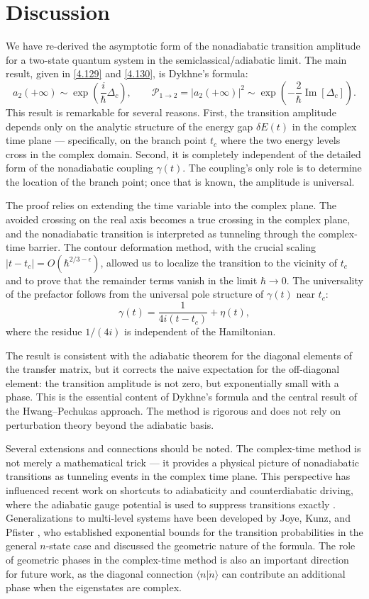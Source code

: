 \documentclass[12pt,a4paper]{article}
\begin{document}
	\section{Discussion} 
	
	We have re-derived the asymptotic form of the nonadiabatic transition amplitude for a two-state quantum system in the semiclassical/adiabatic limit. The main result, given in \eqref{4.129} and \eqref{4.130}, is Dykhne's formula:
	\[
	a_2(+\infty) \sim \exp\left( \frac{i}{\hbar} \Delta_c \right), \qquad 
	\mathcal{P}_{1 \to 2} = |a_2(+\infty)|^2 \sim \exp\left( -\frac{2}{\hbar} \operatorname{Im}[\Delta_c] \right).
	\]
	This result is remarkable for several reasons. First, the transition amplitude depends only on the analytic structure of the energy gap $\delta E(t)$ in the complex time plane — specifically, on the branch point $t_c$ where the two energy levels cross in the complex domain. Second, it is completely independent of the detailed form of the nonadiabatic coupling $\gamma(t)$. The coupling's only role is to determine the location of the branch point; once that is known, the amplitude is universal.
	
	The proof relies on extending the time variable into the complex plane. The avoided crossing on the real axis becomes a true crossing in the complex plane, and the nonadiabatic transition is interpreted as tunneling through the complex-time barrier. The contour deformation method, with the crucial scaling $|t - t_c| = O(\hbar^{2/3 - \epsilon})$, allowed us to localize the transition to the vicinity of $t_c$ and to prove that the remainder terms vanish in the limit $\hbar \to 0$. The universality of the prefactor follows from the universal pole structure of $\gamma(t)$ near $t_c$:
	\[
	\gamma(t) = \frac{1}{4i(t - t_c)} + \eta(t),
	\]
	where the residue $1/(4i)$ is independent of the Hamiltonian.
	
	The result is consistent with the adiabatic theorem for the diagonal elements of the transfer matrix, but it corrects the naive expectation for the off-diagonal element: the transition amplitude is not zero, but exponentially small with a phase. This is the essential content of Dykhne's formula and the central result of the Hwang–Pechukas approach. The method is rigorous and does not rely on perturbation theory beyond the adiabatic basis.
	
	Several extensions and connections should be noted. The complex-time method is not merely a mathematical trick — it provides a physical picture of nonadiabatic transitions as tunneling events in the complex time plane. This perspective has influenced recent work on shortcuts to adiabaticity and counterdiabatic driving, where the adiabatic gauge potential is used to suppress transitions exactly \cite{Cardoso2023}. Generalizations to multi-level systems have been developed by Joye, Kunz, and Pfister \cite{JoyeKunzPfister1991}, who established exponential bounds for the transition probabilities in the general $n$-state case and discussed the geometric nature of the formula. The role of geometric phases in the complex-time method is also an important direction for future work, as the diagonal connection $\langle n|\dot{n}\rangle$ can contribute an additional phase when the eigenstates are complex.
	
\end{document}
